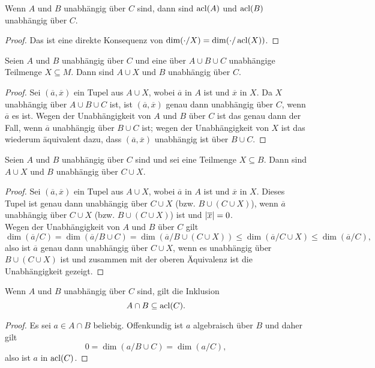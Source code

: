 \begin{lemma}
	Wenn $A$ und $B$ unabhängig über $C$ sind, dann sind $\operatorname{acl}(A)$ und $\operatorname{acl}(B)$ unabhängig über $C$.
\end{lemma}
\begin{proof}
	Das ist eine direkte Konsequenz von $\dim(\cdot/X)=\dim(\cdot/\operatorname{acl}(X))$.
\end{proof}

\begin{lemma}
	Seien $A$ und $B$ unabhängig über $C$ und eine über $A\cup B\cup C$ unabhängige Teilmenge $X\subseteq M$. Dann sind $A\cup X$ und $B$ unabhängig über $C$.
\end{lemma}
\begin{proof}
	Sei $(\overline{a},\overline{x})$ ein Tupel aus $A\cup X$, wobei $\overline{a}$ in $A$ ist und $\overline{x}$ in $X$. Da $X$ unabhängig über $A\cup B\cup C$ ist, ist $(\overline{a},\overline{x})$ genau dann unabhängig über $C$, wenn $\overline{a}$ es ist. Wegen der Unabhängigkeit von $A$ und $B$ über $C$ ist das genau dann der Fall, wenn $\overline{a}$ unabhängig über $B\cup C$ ist; wegen der Unabhängigkeit von $X$ ist das wiederum äquivalent dazu, dass $(\overline{a},\overline{x})$ unabhängig ist über $B\cup C$.
\end{proof}

\begin{lemma}
	Seien $A$ und $B$ unabhängig über $C$ sind und sei eine Teilmenge $X\subseteq B$. Dann sind $A\cup X$ und $B$ unabhängig über $C\cup X$.
\end{lemma}
\begin{proof}
	Sei $(\overline{a},\overline{x})$ ein Tupel aus $A\cup X$, wobei $\overline{a}$ in $A$ ist und $\overline{x}$ in $X$. Dieses Tupel ist genau dann unabhängig über $C\cup X$ (bzw. $B\cup(C\cup X)$), wenn $\overline{a}$ unabhängig über $C\cup X$ (bzw. $B\cup(C\cup X)$) ist und ${\left| \overline{x} \right|}=0$.\\
	Wegen der Unabhängigkeit von $A$ und $B$ über $C$ gilt $$\dim(\overline{a}/C)=\dim(\overline{a}/B\cup C)=\dim(\overline{a}/B\cup(C\cup X))\leq\dim(\overline{a}/C\cup X)\leq\dim(\overline{a}/C),$$ also ist $\overline{a}$ genau dann unabhängig über $C\cup X$, wenn es unabhängig über $B\cup(C\cup X)$ ist und zusammen mit der oberen Äquivalenz ist die Unabhängigkeit gezeigt.
\end{proof}

\begin{lemma}
	Wenn $A$ und $B$ unabhängig über $C$ sind, gilt die Inklusion $$A\cap B\subseteq\operatorname{acl}(C).$$
\end{lemma}
\begin{proof}
	Es sei $a\in A\cap B$ beliebig. Offenkundig ist $a$ algebraisch über $B$ und daher gilt $$0=\dim(a/B\cup C)=\dim(a/C),$$ also ist $a$ in $\operatorname{acl}(C)$.
\end{proof}